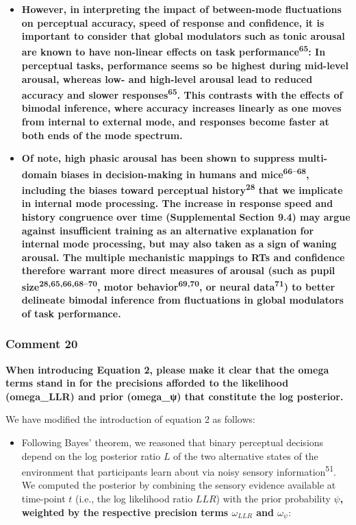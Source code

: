 \documentclass[
]{article}
\providecommand{\tightlist}{%
  \setlength{\itemsep}{0pt}\setlength{\parskip}{0pt}}
\begin{document}
\begin{itemize}
{  fatigue.}
\item
  \textbf{However, in interpreting the impact of between-mode
  fluctuations on perceptual accuracy, speed of response and confidence,
  it is important to consider that global modulators such as tonic
  arousal are known to have non-linear effects on task
  performance\textsuperscript{65}: In perceptual tasks, performance
  seems so be highest during mid-level arousal, whereas low- and
  high-level arousal lead to reduced accuracy and slower
  responses\textsuperscript{65}. This contrasts with the effects of
  bimodal inference, where accuracy increases linearly as one moves from
  internal to external mode, and responses become faster at both ends of
  the mode spectrum.}
\item
  \textbf{Of note, high phasic arousal has been shown to suppress
  multi-domain biases in decision-making in humans and
  mice\textsuperscript{66--68}, including the biases toward perceptual
  history\textsuperscript{28} that we implicate in internal mode
  processing. The increase in response speed and history congruence over
  time (Supplemental Section 9.4) may argue against insufficient
  training as an alternative explanation for internal mode processing,
  but may also taken as a sign of waning arousal. The multiple
  mechanistic mappings to RTs and confidence therefore warrant more
  direct measures of arousal (such as pupil
  size\textsuperscript{28,65,66,68--70}, motor
  behavior\textsuperscript{69,70}, or neural data\textsuperscript{71})
  to better delineate bimodal inference from fluctuations in global
  modulators of task performance.}
\end{itemize}

\hypertarget{comment-20}{%
\subsubsection{Comment 20}\label{comment-20}}

\textbf{When introducing Equation 2, please make it clear that the omega
terms stand in for the precisions afforded to the likelihood
(omega\_LLR) and prior (omega\_ψ) that constitute the log posterior.}

We have modified the introduction of equation 2 as follows:

\begin{itemize}
\tightlist
\item
  Following Bayes' theorem, we reasoned that binary perceptual decisions
  depend on the log posterior ratio \(L\) of the two alternative states
  of the environment that participants learn about via noisy sensory
  information\textsuperscript{51}. We computed the posterior by
  combining the sensory evidence available at time-point \(t\) (i.e.,
  the log likelihood ratio \(LLR\)) with the prior probability
  \(\psi\)\textbf{, weighted by the respective precision terms
  \(\omega_{LLR}\) and \(\omega_{\psi}\)}:
\end{itemize}
\end{document}
